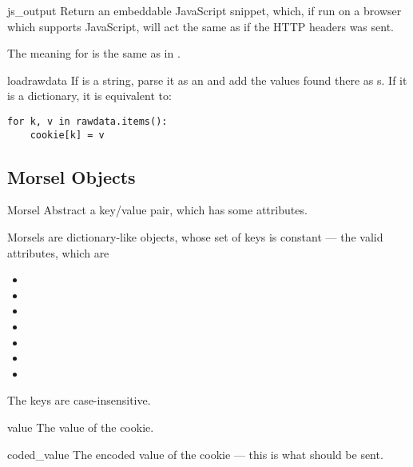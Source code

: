 \begin{methoddesc}[BaseCookie]{js_output}{}
Return an embeddable JavaScript snippet, which, if run on a browser which
supports JavaScript, will act the same as if the HTTP headers was sent.

The meaning for  is the same as in .
\end{methoddesc}

\begin{methoddesc}[BaseCookie]{load}{rawdata}
If  is a string, parse it as an  and add
the values found there as s. If it is a dictionary, it
is equivalent to:

\begin{verbatim}
for k, v in rawdata.items():
    cookie[k] = v
\end{verbatim}
\end{methoddesc}


\subsection{Morsel Objects \label{morsel-objects}}

\begin{classdesc}{Morsel}{}
Abstract a key/value pair, which has some  attributes.

Morsels are dictionary-like objects, whose set of keys is constant ---
the valid  attributes, which are

\begin{itemize}
\item {}
\item {}
\item {}
\item {}
\item {}
\item {}
\item {}
\end{itemize}

The keys are case-insensitive.
\end{classdesc}

\begin{memberdesc}[Morsel]{value}
The value of the cookie.
\end{memberdesc}

\begin{memberdesc}[Morsel]{coded_value}
The encoded value of the cookie --- this is what should be sent.
\end{memberdesc}

